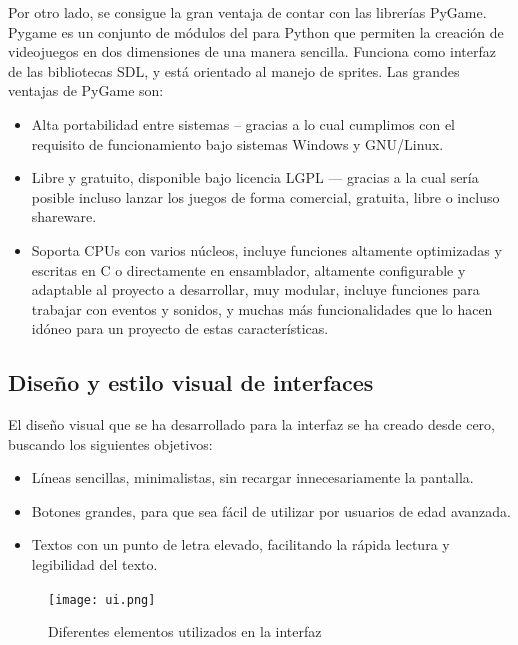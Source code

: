 Por otro lado, se consigue la gran ventaja de contar con las librerías PyGame. Pygame es un conjunto de módulos del
para Python que permiten la creación de videojuegos en dos dimensiones de una manera sencilla.
Funciona como interfaz de las bibliotecas SDL, y está orientado al manejo de sprites. Las grandes ventajas de PyGame son:
\begin{itemize}
    \item Alta portabilidad entre sistemas -- gracias a lo cual cumplimos con el requisito de funcionamiento bajo
            sistemas Windows y GNU/Linux.
    \item Libre y gratuito, disponible bajo licencia LGPL --- gracias a la cual sería posible incluso lanzar los juegos
            de forma comercial, gratuita, libre o incluso shareware.
    \item Soporta CPUs con varios núcleos, incluye funciones altamente optimizadas y escritas en C o directamente en
            ensamblador, altamente configurable y adaptable al proyecto a desarrollar, muy modular, incluye funciones
            para trabajar con eventos y sonidos, y muchas más funcionalidades que lo hacen idóneo para un proyecto
            de estas características.
\end{itemize}

\subsection{Diseño y estilo visual de interfaces}

El diseño visual que se ha desarrollado para la interfaz se ha creado desde cero, buscando los siguientes objetivos:
\begin{itemize}
    \item Líneas sencillas, minimalistas, sin recargar innecesariamente la pantalla.
    \item Botones grandes, para que sea fácil de utilizar por usuarios de edad avanzada.
    \item Textos con un punto de letra elevado, facilitando la rápida lectura y legibilidad del texto.
\end{itemize}

\begin{figure}[h]
  \begin{center}
    \texttt{[image: ui.png]}
  \end{center}
  \caption{Diferentes elementos utilizados en la interfaz}
  \label{interfaz}
\end{figure}

